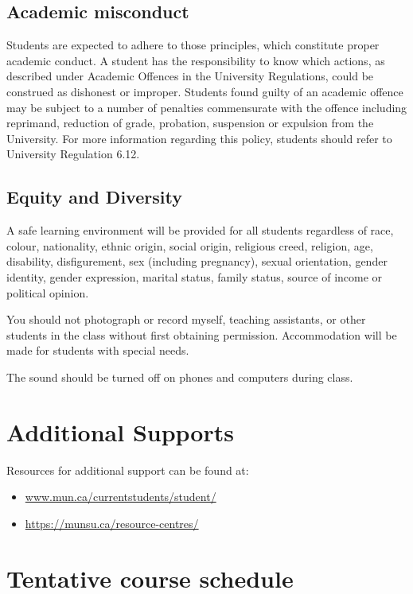 \documentclass[]{book}
\begin{document}
\subsection{Academic misconduct}\label{academic-misconduct}

Students are expected to adhere to those principles, which constitute
proper academic conduct. A student has the responsibility to know which
actions, as described under Academic Offences in the University
Regulations, could be construed as dishonest or improper. Students found
guilty of an academic offence may be subject to a number of penalties
commensurate with the offence including reprimand, reduction of grade,
probation, suspension or expulsion from the University. For more
information regarding this policy, students should refer to University
Regulation 6.12.

\subsection{Equity and Diversity}\label{equity-and-diversity}

A safe learning environment will be provided for all students regardless
of race, colour, nationality, ethnic origin, social origin, religious
creed, religion, age, disability, disfigurement, sex (including
pregnancy), sexual orientation, gender identity, gender expression,
marital status, family status, source of income or political opinion.

You should not photograph or record myself, teaching assistants, or
other students in the class without first obtaining permission.
Accommodation will be made for students with special needs.

The sound should be turned off on phones and computers during class.

\section{Additional Supports}\label{additional-supports}

Resources for additional support can be found at:

\begin{itemize}
\item
  \url{www.mun.ca/currentstudents/student/}
\item
  \url{https://munsu.ca/resource-centres/}
\end{itemize}

\section{Tentative course schedule}\label{tentative-course-schedule}
\end{document}
